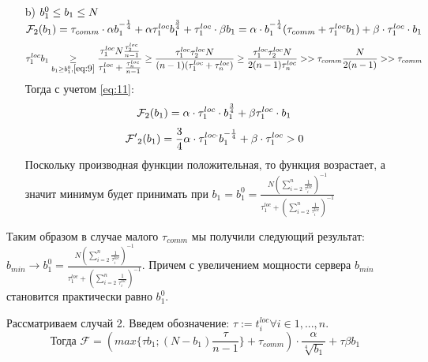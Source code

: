 \documentclass{article}
\begin{document}
\begin{itemize}
    \item[b)] $b_1^0\leq b_1\leq N\\$
    $\mathcal{F}_2(b_1) = \tau_{comm}\cdot 
    \alpha  b_1^{-\frac{1}{4}} + 
    \alpha\tau_1^{loc} b_1^{\frac{3}{4}}  + \tau_1^{loc}\cdot \beta b_1 =  \alpha\cdot b_1^{-\frac{1}{4}}(\tau_{comm} + \tau_1^{loc}b_1) + \beta\cdot\tau_1^{loc}\cdot b_1\\$
    \begin{eqnarray}
        \label{eq:11}
        \begin{split}
            \tau_1^{loc}b_1\underset{b_1\geq b_1^0, \ref{eq:9}}{\geq} \frac{\tau_1^{loc}N\frac{\tau_2^{loc}}{n - 1}}{\tau_1^{loc} + \frac{\tau_n^{loc}}{n - 1}}\geq \frac{\tau_1^{loc}\tau_2^{loc}N}{(n - 1)(\tau_1^{loc} + \tau_n^{loc})}\geq \frac{\tau_1^{loc}\tau_2^{loc}N}{2(n - 1)\tau_n^{loc}} >> \tau_{comm}\frac{N}{2(n - 1)} >> \tau_{comm}
        \end{split}
    \end{eqnarray}
    Тогда с учетом \ref{eq:11}:
    \begin{equation}
        \notag
        \mathcal F_2(b_1) = \alpha\cdot\tau_1^{loc}\cdot b_1^{\frac{3}{4}} + \beta \tau_1^{loc}\cdot b_1
    \end{equation}
    \begin{equation}
        \notag
        \mathcal{F'}_2(b_1) = \frac{3}{4}\alpha\cdot\tau_1^{loc\cdot} b_1^{-\frac{1}{4}} + \beta\cdot\tau_1^{loc} > 0
    \end{equation}
    Поскольку производная функции положительная, то функция возрастает, а значит минимум будет принимать при $b_1 = b_1^{0} = \frac{N (\sum\limits_{i = 2}^{n} \frac{1}{\tau_i^{loc}})^{-1}}{\tau_1^{loc} + (\sum\limits_{i = 2}^{n} \frac{1}{\tau_i^{loc}})^{-1}}$  
\end{itemize}

Таким образом в случае малого $\tau_{comm}$ мы получили следующий результат:\\
$b_{min}\rightarrow b_1^{0} = \frac{N (\sum\limits_{i = 2}^{n} \frac{1}{\tau_i^{loc}})^{-1}}{\tau_1^{loc} + (\sum\limits_{i = 2}^{n} \frac{1}{\tau_i^{loc}})^{-1}}$. Причем с увеличением мощности сервера $b_{min}$ становится практически равно $b_1^0$.

Рассматриваем случай 2. 
Введем обозначение: $\tau := t_i^{loc} \forall i \in {1,..., n} $. 
\begin{equation}
        \textbf{Тогда }\mathcal{F} = (max\{\tau b_1; (N-b_1) \frac{\tau}{n-1}\} + \tau_{comm}) \cdot \frac{\alpha}{\sqrt[4]{b_1}}+\tau \beta b_1 
\end{equation}
\end{document}

